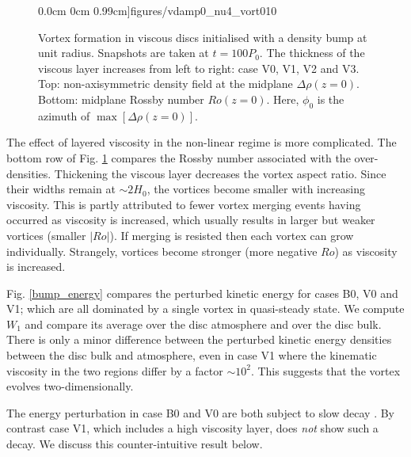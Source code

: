 \begin{figure}
     0.0cm 0cm
     0.99cm]{figures/vdamp0_nu4_vort010}
   \caption{Vortex formation in viscous discs initialised with
     a density bump at unit radius. Snapshots are taken at $t=100P_0$. The
     thickness of the viscous layer increases from left to 
     right: case V0, V1, V2 and V3.   
     Top: non-axisymmetric density field at the midplane
     $\Delta\rho(z=0)$. Bottom: midplane Rossby number
     $Ro(z=0)$. Here, $\phi_0$ is the azimuth of $\max[\Delta\rho(z=0)]$. 
     \label{vdamp0}
   }
\end{figure}
 

The effect of layered viscosity in the non-linear regime is more
complicated. The bottom row of Fig. \ref{vdamp0} compares the Rossby number
associated with the over-densities. Thickening the viscous 
layer decreases the vortex aspect ratio. Since their widths remain
at $\sim 2H_0$, the vortices become smaller with increasing
viscosity. This is partly attributed to fewer vortex merging
events having occurred as viscosity is increased, which 
usually results in larger but weaker vortices (smaller
$|Ro|$). If merging is resisted then each vortex can grow individually.  
Strangely, vortices become stronger  (more negative $Ro$) as viscosity
is increased. 

Fig. \ref{bump_energy} compares the perturbed kinetic energy for 
cases B0, V0 and V1; which are all dominated by a single vortex in 
quasi-steady state. We compute $W_1$ and compare its
average over the disc atmosphere and over the 
disc bulk. There is only a minor difference between the
perturbed kinetic energy densities between the disc bulk and
atmosphere, even in case V1 where the kinematic viscosity in the two
regions differ by a factor $\sim10^2$. This suggests that the
vortex evolves two-dimensionally. 

The energy perturbation in case B0 and V0 are both subject to
slow decay \citep[a result also observed by][]{meheut12}.  
By contrast case V1, which includes a high viscosity layer, does
\emph{not} show such a decay. We discuss this counter-intuitive result
below.  

